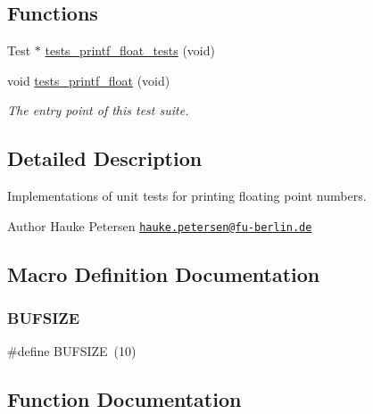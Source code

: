 \subsection*{Functions}
\begin{DoxyCompactItemize}
\item 
Test $\ast$ \hyperlink{tests-printf__float_8c_aa64c21be015c861a67a3a93aba74160f}{tests\+\_\+printf\+\_\+float\+\_\+tests} (void)
\item 
void \hyperlink{group__unittests_ga931f7ea19ee04d7b42dd1adb0f8ad87a}{tests\+\_\+printf\+\_\+float} (void)
\begin{DoxyCompactList}\small\item\em The entry point of this test suite. \end{DoxyCompactList}\end{DoxyCompactItemize}


\subsection{Detailed Description}
Implementations of unit tests for printing floating point numbers. 

\begin{DoxyAuthor}{Author}
Hauke Petersen \href{mailto:hauke.petersen@fu-berlin.de}{\tt hauke.\+petersen@fu-\/berlin.\+de} 
\end{DoxyAuthor}


\subsection{Macro Definition Documentation}
\mbox{\label{tests-printf__float_8c_aeca034f67218340ecb2261a22c2f3dcd}} 
\subsubsection{\texorpdfstring{B\+U\+F\+S\+I\+ZE}{BUFSIZE}}
{\footnotesize\ttfamily \#define B\+U\+F\+S\+I\+ZE~(10)}



\subsection{Function Documentation}
\mbox{\label{tests-printf__float_8c_aa64c21be015c861a67a3a93aba74160f}} 
